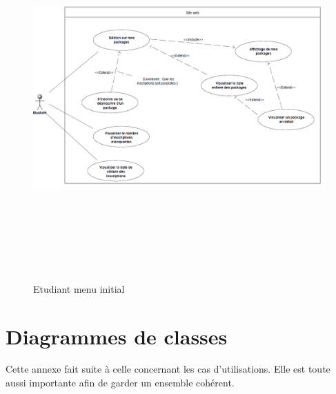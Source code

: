     \begin{figure}[h]
        \begin{center}
            \includegraphics[height=14cm,width=15cm]{images/uml/etudiantMenuInitial.png} 
        \end{center}

        \caption{Etudiant menu initial}
        \label{Etudiant menu initial}
    \end{figure}






\chapter{Diagrammes de classes}
    Cette annexe fait suite à celle concernant les cas d'utilisations. Elle est 
toute aussi importante afin de garder un ensemble cohérent.


